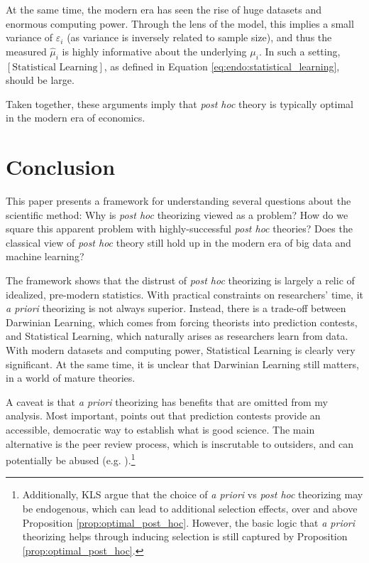 \documentclass[12pt,english]{article}
\theoremstyle{plain}
\theoremstyle{plain}
\begin{document}
At the same time, the modern era has seen the rise of huge datasets and enormous computing power. Through the lens of the model, this implies a small variance of $\varepsilon_{i}$ (as variance is inversely related to sample size), and thus the measured $\hat{\mu}_{i}$ is highly informative about the underlying $\mu_{i}$. In such a setting, $\left[\text{Statistical Learning}\right]$, as defined in Equation \eqref{eq:endo:statistical_learning}, should be large. 

Taken together, these arguments imply that \emph{post hoc} theory is typically optimal in the modern era of economics.


\section{Conclusion}

This paper presents a framework for understanding several questions about the scientific method: Why is \emph{post hoc} theorizing viewed as a problem? 
How do we square this apparent problem with highly-successful \emph{post hoc} theories? Does the classical view of \emph{post hoc} theory still hold up in the modern era of big data and machine learning? 

The framework shows that the distrust of \emph{post hoc} theorizing is largely a relic of  idealized, pre-modern statistics. With practical constraints on researchers' time, it \emph{a priori} theorizing is not always superior. Instead, there is a trade-off between  Darwinian Learning, which comes from forcing theorists into prediction contests, and Statistical Learning, which naturally arises as researchers learn from data. With  modern datasets and computing power, Statistical Learning is clearly very significant. At the same time, it is unclear that Darwinian Learning still matters, in a world of mature theories.

A caveat is that \emph{a priori} theorizing has benefits that are omitted from my analysis. Most important, \citet{barnes2008paradox} points out that prediction contests provide an accessible, democratic way to establish what is good science. The main alternative is the peer review process, which is inscrutable to outsiders, and can potentially be abused (e.g. \citet{chen2024most}).\footnote{Additionally, KLS argue that the choice of \emph{a priori} vs \emph{post hoc} theorizing may be endogenous, which can lead to additional selection effects, over and above Proposition \ref{prop:optimal_post_hoc}. However, the basic logic that \emph{a priori} theorizing helps through inducing selection is still captured by Proposition \ref{prop:optimal_post_hoc}.}
\end{document}
